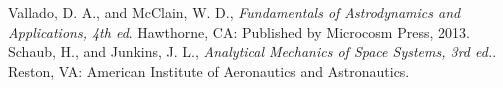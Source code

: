 \begin{thebibliography}{1}
	Vallado, D. A., and McClain, W. D., \textit{Fundamentals of Astrodynamics and Applications, 4th ed}. Hawthorne, CA: Published by Microcosm Press, 2013.
	Schaub, H., and Junkins, J. L., \textit{Analytical Mechanics of Space Systems, 3rd ed.}. Reston, VA: American Institute of Aeronautics and Astronautics.
\end{thebibliography}